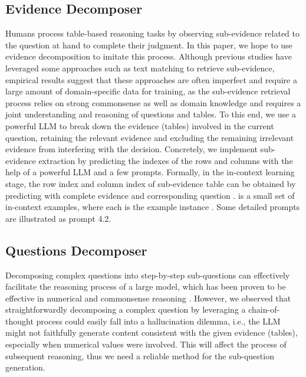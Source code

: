 \documentclass{article}
\begin{document}
\subsection{Evidence Decomposer}
Humans process table-based reasoning tasks by observing sub-evidence related to the question at hand to complete their judgment. In this paper, we hope to use evidence decomposition to imitate this process.
Although previous studies have leveraged some approaches \citep{yin2020tabert,tabfact} such as text matching to retrieve sub-evidence, empirical results suggest that these approaches are often imperfect and require a large amount of domain-specific data for training, as the sub-evidence retrieval process relies on strong commonsense as well as domain knowledge and requires a joint understanding and reasoning of questions and tables.
To this end, we use a powerful LLM to break down the evidence (tables) involved in the current question, retaining the relevant evidence and excluding the remaining irrelevant evidence from interfering with the decision. 
Concretely, we implement sub-evidence extraction by predicting the indexes of the rows and columns with the help of a powerful LLM and a few prompts.
Formally, in the in-context learning stage, the row index  and column index  of sub-evidence table  can be obtained by predicting  with complete evidence  and corresponding question .  is a small set of in-context examples, where each  is the example instance . Some detailed prompts are illustrated as prompt 4.2.


\subsection{Questions Decomposer}
Decomposing complex questions into step-by-step sub-questions can effectively facilitate the reasoning process of a large model, which has been proven to be effective in numerical and commonsense reasoning \citep{huang2022language,dua2022successive,pot}. However, we observed that 
straightforwardly decomposing a complex question by leveraging a chain-of-thought process could easily fall into a hallucination dilemma, i.e., the LLM might not faithfully generate content consistent with the given evidence (tables), especially when numerical values were involved. This will affect the process of subsequent reasoning, thus we need a reliable method for the sub-question generation.
\end{document}

